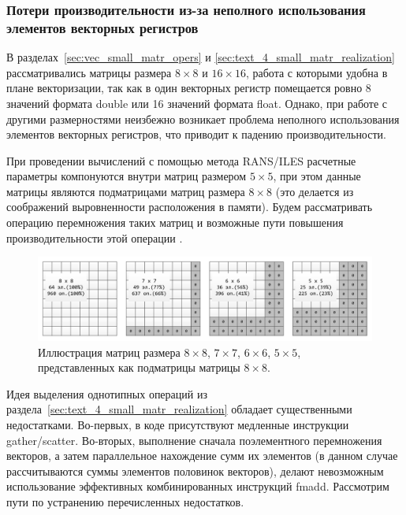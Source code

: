 \subsubsection{Потери производительности из-за неполного \mbox{использования} элементов векторных регистров}\label{sec:text_4_spec_matr}

В разделах~\ref{sec:vec_small_matr_opers} и \ref{sec:text_4_small_matr_realization} рассматривались матрицы размера $8 \times 8$ и $16 \times 16$, работа с которыми удобна в плане векторизации, так как в один векторных регистр помещается ровно 8 значений формата double или 16 значений формата float.
Однако, при работе с другими размерностями неизбежно возникает проблема неполного использования элементов векторных регистров, что приводит к падению производительности.

При проведении вычислений с помощью метода RANS/ILES расчетные параметры компонуются внутри матриц размером $5 \times 5$, при этом данные матрицы являются подматрицами матриц размера $8 \times 8$ (это делается из соображений выровненности расположения в памяти).
Будем рассматривать операцию перемножения таких матриц и возможные пути повышения производительности этой операции \cite{Bendersky2018VecMat1}. 

\begin{figure}[ht]
\centering
\includegraphics[width=1.00\textwidth]{./fig/vec_spec_matrices.pdf}
\singlespacing
{}\caption{Иллюстрация матриц размера $8 \times 8$, $7 \times 7$, $6 \times 6$, $5 \times 5$, представленных как подматрицы матрицы $8 \times 8$.}
\label{fig:text_4_spec_matr_matrices}
\end{figure}

Идея выделения однотипных операций из раздела~\ref{sec:text_4_small_matr_realization} обладает существенными недостатками.
Во-первых, в коде присутствуют медленные инструкции gather/scatter.
Во-вторых, выполнение сначала поэлементного перемножения векторов, а затем параллельное нахождение сумм их элементов (в данном случае рассчитываются суммы элементов половинок векторов), делают невозможным использование эффективных комбинированных инструкций fmadd.
Рассмотрим пути по устранению перечисленных недостатков.

